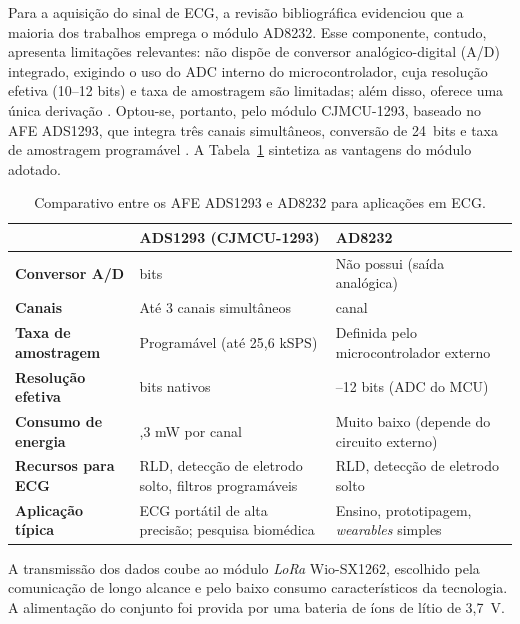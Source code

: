 Para a aquisição do sinal de ECG, a revisão bibliográfica evidenciou que a maioria dos trabalhos emprega o módulo AD8232. Esse componente, contudo, apresenta limitações relevantes: não dispõe de conversor analógico-digital (A/D) integrado, exigindo o uso do \acs{ADC} interno do microcontrolador, cuja resolução efetiva (10--12 bits) e taxa de amostragem são limitadas; além disso, oferece uma única derivação \citep{AnalogDevices_AD8232}. Optou-se, portanto, pelo módulo CJMCU-1293, baseado no \acs{AFE} ADS1293, que integra três canais simultâneos, conversão de 24~bits e taxa de amostragem programável \citep{TexasInstruments_ADS1293}. A Tabela~\ref{tab:ads_vs_ad8232} sintetiza as vantagens do módulo adotado.

\begin{table}[h]
    \centering
    \caption{Comparativo entre os \acs{AFE} ADS1293 e AD8232 para aplicações em \acs{ECG}.}
    \begin{tabular}{l|>{\centering\arraybackslash}m{4.5cm}|>{\centering\arraybackslash}m{4.5cm}}
         & \textbf{ADS1293 (CJMCU-1293)} & \textbf{AD8232} \\ \hline
        \textbf{Conversor A/D} & 24 bits & Não possui (saída analógica) \\ \hline
        \textbf{Canais} & Até 3 canais simultâneos & 1 canal \\ \hline
        \textbf{Taxa de amostragem} & Programável (até 25,6 kSPS) & Definida pelo microcontrolador externo \\ \hline
        \textbf{Resolução efetiva} & 24 bits nativos & 10--12 bits (ADC do MCU) \\ \hline
        \textbf{Consumo de energia} & 0,3 mW por canal & Muito baixo (depende do circuito externo) \\ \hline
        \textbf{Recursos para ECG} & RLD, detecção de eletrodo solto, filtros programáveis & RLD, detecção de eletrodo solto \\ \hline
        \textbf{Aplicação típica} & ECG portátil de alta precisão; pesquisa biomédica & Ensino, prototipagem, \textit{wearables} simples \\ \hline
    \end{tabular}
    \label{tab:ads_vs_ad8232}
\end{table}

A transmissão dos dados coube ao módulo \textit{LoRa} Wio-SX1262, escolhido pela comunicação de longo alcance e pelo baixo consumo característicos da tecnologia. A alimentação do conjunto foi provida por uma bateria de íons de lítio de 3,7~V. 

